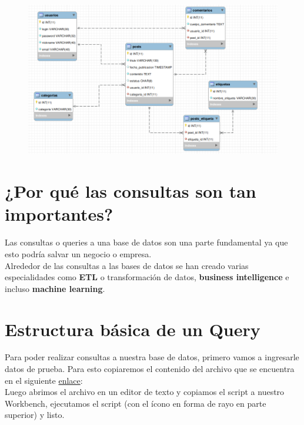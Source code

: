 \documentclass{article}
\begin{document}
\newpage

\begin{figure}[h!]
  \centering
  \includegraphics[scale=0.55]{./Pictures/077_diag_fisico_workbench.png}
\end{figure}


\section{¿Por qué las consultas son tan importantes?}%
Las consultas o queries a una base de datos son una parte fundamental ya que
esto podría salvar un negocio o empresa.\\

Alrededor de las consultas a las bases de datos se han creado varias
especialidades como \textbf{ETL} o transformación de datos, \textbf{business
intelligence} e incluso \textbf{machine learning}.

\newpage

\section{Estructura básica de un Query}%
Para poder realizar consultas a nuestra base de datos, primero vamos a
ingresarle datos de prueba. Para esto copiaremos el contenido del archivo que
se encuentra en el siguiente
\href{https://raw.githubusercontent.com/gprunecode/tutorials/master/Platzi/Fundamentos/FundBD/Recursos/Datos_prueba.sql}{enlace}:\\

Luego abrimos el archivo en un editor de texto y copiamos el script a nuestro
Workbench, ejecutamos el script (con el ícono en forma de rayo en parte
superior) y listo.\\
\end{document}
